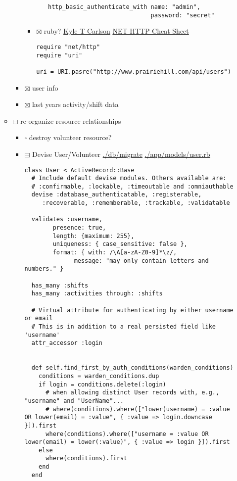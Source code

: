 \documentclass[11pt]{article}
\begin{document}
\begin{itemize}
\begin{itemize}
\begin{itemize}
\begin{itemize}
\begin{itemize}
\begin{verbatim}
http_basic_authenticate_with name: "admin", 
                             password: "secret"
\end{verbatim}
\end{itemize}

\item $\boxtimes$ ruby?
\href{https://gist.github.com/kyletcarlson/7911188}{Kyle T Carlson}
\href{http://www.rubyinside.com/nethttp-cheat-sheet-2940.html}{NET HTTP Cheat Sheet}

\begin{verbatim}
require "net/http"
require "uri"

uri = URI.pasre("http://www.prairiehill.com/api/users")
\end{verbatim}
\end{itemize}

\item $\boxtimes$ user info
\item $\boxtimes$ last years activity/shift data
\end{itemize}
\item $\boxminus$ re-organize resource relationships
\begin{itemize}
\item $\square$ destroy volunteer resource?
\item $\boxminus$ Devise User/Volunteer
\url{./db/migrate}
\url{./app/models/user.rb}
\begin{verbatim}
class User < ActiveRecord::Base
  # Include default devise modules. Others available are:
  # :confirmable, :lockable, :timeoutable and :omniauthable
  devise :database_authenticatable, :registerable,
	 :recoverable, :rememberable, :trackable, :validatable

  validates :username,
	    presence: true,
	    length: {maximum: 255},
	    uniqueness: { case_sensitive: false },
	    format: { with: /\A[a-zA-Z0-9]*\z/,
		      message: "may only contain letters and numbers." }

  has_many :shifts
  has_many :activities through: :shifts

  # Virtual attribute for authenticating by either username or email
  # This is in addition to a real persisted field like 'username'
  attr_accessor :login


  def self.find_first_by_auth_conditions(warden_conditions)
    conditions = warden_conditions.dup
    if login = conditions.delete(:login)
      # when allowing distinct User records with, e.g., "username" and "UserName"...
      # where(conditions).where(["lower(username) = :value OR lower(email) = :value", { :value => login.downcase }]).first
      where(conditions).where(["username = :value OR lower(email) = lower(:value)", { :value => login }]).first
    else
      where(conditions).first
    end
  end


\end{verbatim}
\end{itemize}
\end{itemize}
\end{itemize}
\end{document}
